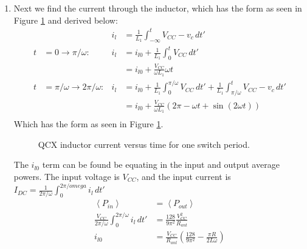 \documentclass[10pt,letterpaper]{article}
\begin{document}
\begin{enumerate}
\item Next we find the current through the inductor, which has the form as seen in Figure \ref{QCXilplot} and derived below:
\begin{align*}
& &i_l&=\frac{1}{L_1}\int_{-\infty}^t V_{CC}-v_c\, dt'\\
t&=0\rightarrow \pi/\omega: &i_l&=i_{l0} +\frac{1}{L_1}\int_{0}^t V_{CC}\, dt' \\
& &&=i_{l0}+\frac{V_{CC}}{\omega L_1}\omega t\\
t&=\pi/\omega\rightarrow 2\pi/\omega: &i_l&=i_{l0} +\frac{1}{L_1}\int_{0}^{\pi/\omega} V_{CC}\, dt' +\frac{1}{L_1}\int_{\pi/\omega}^t V_{CC}-v_c\, dt'\\
& &&=i_{l0}+\frac{V_{CC}}{\omega L_1}\left(2\pi-\omega t+\sin(2\omega t)\right)\\
\end{align*}
Which has the form as seen in Figure \ref{QCXilplot}.
\begin{figure}
\centering
{}
\caption{QCX inductor current versus time for one switch period.}
\label{QCXilplot}
\end{figure}

The $i_{l0}$ term can be found be equating in the input and output average powers. The input voltage is $V_{CC}$, and the input current is $I_{DC}=\frac{1}{2\pi/\omega}\int_0^{2\pi/omega}i_l\, dt'$
\begin{align*}
\left\langle P_{in} \right\rangle &= \left\langle P_{out} \right\rangle\\
\frac{V_{CC}}{2\pi/\omega}\int_0^{2\pi/\omega} i_l \, dt'&=\frac{128}{9\pi^2}\frac{V_{CC}^2}{R_{ant}}\\
i_{l0}&=\frac{V_{CC}}{R_{ant}}\left(\frac{128}{9\pi^2}-\frac{\pi R}{2 L\omega}\right)
\end{align*}



\end{enumerate}
\end{document}
